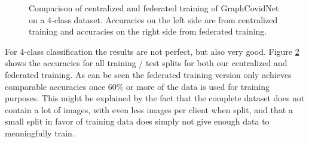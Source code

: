 \begin{figure}[htbp]
\begin{subfigure}{.45\textwidth}
      \label{fig:graphcovidnet_4_class_accuracies_fed}
    \end{subfigure}
    \caption{Comparison of centralized and federated training of GraphCovidNet on a 4-class dataset. Accuracies on the left side are from centralized training and accuracies on the right side from federated training.}
    \label{fig:graphcovidnet_4_class_accuracies}
\end{figure}

For 4-class classification the results are not perfect, but also very good. Figure \ref{fig:graphcovidnet_4_class_accuracies} shows the accuracies for all training / test splits for both our centralized and federated training. As can be seen the federated training version only achieves comparable accuracies once 60\% or more of the data is used for training purposes. This might be explained by the fact that the complete dataset does not contain a lot of images, with even less images per client when split, and that a small split in favor of training data does simply not give enough data to meaningfully train.
